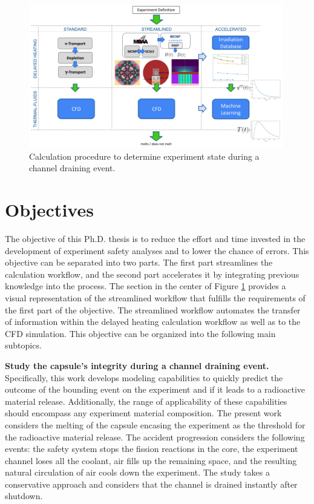 \begin{figure}[htbp!]
  \centering
  \includegraphics[width=0.99\textwidth]{figures/diagram}
  \caption{Calculation procedure to determine experiment state during a channel draining event.}
  \label{fig:diagra1}
\end{figure}


\section{Objectives}

The objective of this Ph.D. thesis is to reduce the effort and time invested in the development of experiment safety analyses and to lower the chance of errors.
This objective can be separated into two parts.
The first part streamlines the calculation workflow, and the second part accelerates it by integrating previous knowledge into the process.
The section in the center of Figure \ref{fig:diagra1} provides a visual representation of the streamlined workflow that fulfills the requirements of the first part of the objective.
The streamlined workflow automates the transfer of information within the delayed heating calculation workflow as well as to the CFD simulation.
This objective can be organized into the following main subtopics.

\textbf{Study the capsule's integrity during a channel draining event.}
Specifically, this work develops modeling capabilities to quickly predict the outcome of the bounding event on the experiment  and if it leads to a radioactive material release.
Additionally, the range of applicability of these capabilities should encompass any experiment material composition.
The present work considers the melting of the capsule encasing the experiment as the threshold for the radioactive material release.
The accident progression considers the following events: the safety system stops the fission reactions in the core, the experiment channel loses all the coolant, air fills up the remaining space, and the resulting natural circulation of air cools down the experiment.
The study takes a conservative approach and considers that the channel is drained instantly after shutdown.

